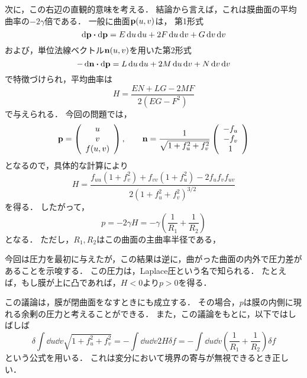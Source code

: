 \documentclass[a4paper,11pt]{jsarticle}
\begin{document}
次に，この右辺の直観的意味を考える．
結論から言えば，これは膜曲面の平均曲率の$-2\gamma$倍である．
一般に曲面$\vectorbold{p}(u,v)$は，
第1形式
\begin{equation}
  \dd{\vectorbold{p}}\vdot\dd{\vectorbold{p}} = E \dd{u}\dd{u} + 2F\dd{u}\dd{v} + G \dd{v}\dd{v}
\end{equation}
および，単位法線ベクトル$\vectorbold{n}(u,v)$を用いた第2形式
\begin{equation}
  -\dd{\vectorbold{n}}\vdot\dd{\vectorbold{p}} =  L\dd{u}\dd{u} + 2M\dd{u}\dd{v} + N \dd{v}\dd{v}
\end{equation}
で特徴づけられ，平均曲率は
\begin{equation}
  H = \frac{EN + LG - 2MF}{2(EG-F^2)}
\end{equation}
で与えられる．
今回の問題では，
\begin{equation}
  \vectorbold{p} = 
  \left(
    \begin{array}{c}
      u \\
      v \\
      f(u,v)
    \end{array}
  \right)
  ,\qquad 
  \vectorbold{n} = \frac{1}{\sqrt{1+f_u^2+f_v^2}}
  \left(
    \begin{array}{c}
      -f_u \\
      -f_v \\
      1
    \end{array}
  \right)
\end{equation}
となるので，具体的な計算により
\begin{equation}
  H = \frac{f_{uu}(1+f_v^2) + f_{vv}(1+f_u^2)-2f_uf_vf_{uv}}{2(1+f_u^2+f_v^2)^{3/2}}
\end{equation}
を得る．
したがって，
\begin{equation}
  p = -2\gamma H = -\gamma \left(\frac{1}{R_1} + \frac{1}{R_2}\right)
\end{equation}
となる．
ただし，$R_1,R_2$はこの曲面の主曲率半径である，

今回は圧力を最初に与えたが，この結果は逆に，曲がった曲面の内外で圧力差があることを示唆する．
この圧力は，Laplace圧という名で知られる．
たとえば，もし膜が上に凸であれば，$H<0$より$p>0$を得る．

この議論は，膜が閉曲面をなすときにも成立する．
その場合，$p$は膜の内側に現れる余剰の圧力と考えることができる．
また，この議論をもとに，以下ではしばしば
\begin{equation}
  \delta \int \dd{u} \dd{v} \sqrt{1+f_u^2 + f_v^2} = - \int \dd{u} \dd{v} 2H\delta f = - \int \dd{u} \dd{v} \left(\frac{1}{R_1} + \frac{1}{R_2}\right) \delta f
\end{equation}
という公式を用いる．
これは変分において境界の寄与が無視できるとき正しい．
\end{document}
